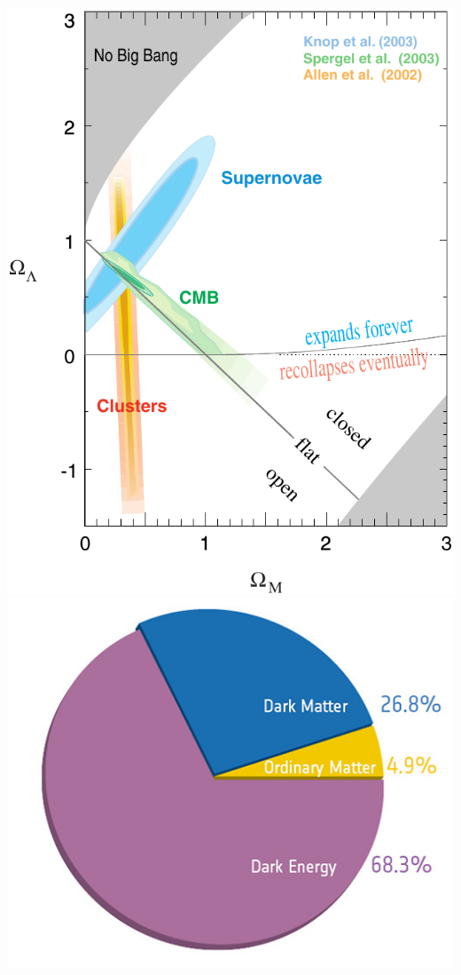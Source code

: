 \documentclass[aspectratio=169]{beamer}
\begin{document}
\begin{frame}
\begin{columns}
        \includegraphics[width=\textwidth]{figures/old_parameters}
        \includegraphics[width=\textwidth]{figures/darkmatterchart_squared}

\end{columns}
\end{frame}
\end{document}
